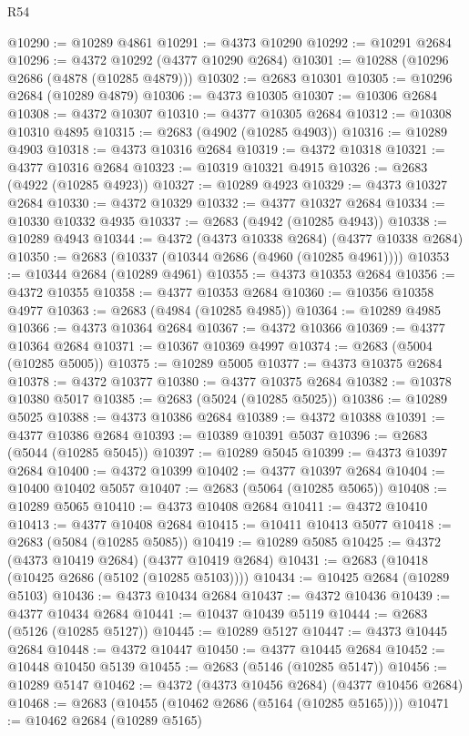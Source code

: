 \begin{lexlean}{R54}
\begin{coremodule}
@10290 := @10289 @4861
@10291 := @4373 @10290
@10292 := @10291 @2684
@10296 := @4372 @10292 (@4377 @10290 @2684)
@10301 := @10288 (@10296 @2686 (@4878 (@10285 @4879)))
@10302 := @2683 @10301
@10305 := @10296 @2684 (@10289 @4879)
@10306 := @4373 @10305
@10307 := @10306 @2684
@10308 := @4372 @10307
@10310 := @4377 @10305 @2684
@10312 := @10308 @10310 @4895
@10315 := @2683 (@4902 (@10285 @4903))
@10316 := @10289 @4903
@10318 := @4373 @10316 @2684
@10319 := @4372 @10318
@10321 := @4377 @10316 @2684
@10323 := @10319 @10321 @4915
@10326 := @2683 (@4922 (@10285 @4923))
@10327 := @10289 @4923
@10329 := @4373 @10327 @2684
@10330 := @4372 @10329
@10332 := @4377 @10327 @2684
@10334 := @10330 @10332 @4935
@10337 := @2683 (@4942 (@10285 @4943))
@10338 := @10289 @4943
@10344 := @4372 (@4373 @10338 @2684) (@4377 @10338 @2684)
@10350 := @2683 (@10337 (@10344 @2686 (@4960 (@10285 @4961))))
@10353 := @10344 @2684 (@10289 @4961)
@10355 := @4373 @10353 @2684
@10356 := @4372 @10355
@10358 := @4377 @10353 @2684
@10360 := @10356 @10358 @4977
@10363 := @2683 (@4984 (@10285 @4985))
@10364 := @10289 @4985
@10366 := @4373 @10364 @2684
@10367 := @4372 @10366
@10369 := @4377 @10364 @2684
@10371 := @10367 @10369 @4997
@10374 := @2683 (@5004 (@10285 @5005))
@10375 := @10289 @5005
@10377 := @4373 @10375 @2684
@10378 := @4372 @10377
@10380 := @4377 @10375 @2684
@10382 := @10378 @10380 @5017
@10385 := @2683 (@5024 (@10285 @5025))
@10386 := @10289 @5025
@10388 := @4373 @10386 @2684
@10389 := @4372 @10388
@10391 := @4377 @10386 @2684
@10393 := @10389 @10391 @5037
@10396 := @2683 (@5044 (@10285 @5045))
@10397 := @10289 @5045
@10399 := @4373 @10397 @2684
@10400 := @4372 @10399
@10402 := @4377 @10397 @2684
@10404 := @10400 @10402 @5057
@10407 := @2683 (@5064 (@10285 @5065))
@10408 := @10289 @5065
@10410 := @4373 @10408 @2684
@10411 := @4372 @10410
@10413 := @4377 @10408 @2684
@10415 := @10411 @10413 @5077
@10418 := @2683 (@5084 (@10285 @5085))
@10419 := @10289 @5085
@10425 := @4372 (@4373 @10419 @2684) (@4377 @10419 @2684)
@10431 := @2683 (@10418 (@10425 @2686 (@5102 (@10285 @5103))))
@10434 := @10425 @2684 (@10289 @5103)
@10436 := @4373 @10434 @2684
@10437 := @4372 @10436
@10439 := @4377 @10434 @2684
@10441 := @10437 @10439 @5119
@10444 := @2683 (@5126 (@10285 @5127))
@10445 := @10289 @5127
@10447 := @4373 @10445 @2684
@10448 := @4372 @10447
@10450 := @4377 @10445 @2684
@10452 := @10448 @10450 @5139
@10455 := @2683 (@5146 (@10285 @5147))
@10456 := @10289 @5147
@10462 := @4372 (@4373 @10456 @2684) (@4377 @10456 @2684)
@10468 := @2683 (@10455 (@10462 @2686 (@5164 (@10285 @5165))))
@10471 := @10462 @2684 (@10289 @5165)

\end{coremodule}
\end{lexlean}
